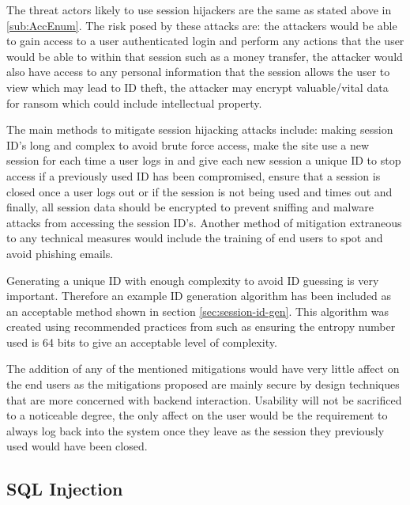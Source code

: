 \documentclass{ueacmpstyle}
\begin{document}
        The threat actors likely to use session hijackers are the same as stated above 
        in \ref{sub:AccEnum}. The risk posed by these attacks are: the attackers would 
        be able to gain access to a user authenticated login and perform any actions that the 
        user would be able to within that session such as a money transfer, the attacker would 
        also have access to any personal information that the session allows the user to view 
        which may lead to ID theft, the attacker may encrypt valuable/vital data for ransom 
        which could include intellectual property.

        The main methods to mitigate session hijacking attacks include: making session ID's 
        long and complex to avoid brute force access, make the site use a new session for 
        each time a user logs in and give each new session a unique ID to stop access if a 
        previously used ID has been compromised, ensure that a session is closed once a user 
        logs out or if the session is not being used and times out and finally, all session 
        data should be encrypted to prevent sniffing and malware attacks from accessing the 
        session ID's. Another method of mitigation extraneous to any technical measures 
        would include the training of end users to spot and avoid phishing emails.

        Generating a unique ID with enough complexity to avoid ID guessing is very important. 
        Therefore an example ID generation algorithm has been included as an acceptable 
        method shown in section \ref{sec:session-id-gen}. This algorithm was created using 
        recommended practices from \cite{OWASPSessionManagement} such as ensuring the entropy 
        number used is 64 bits to give an acceptable level of complexity.

        The addition of any of the mentioned mitigations would have very little affect on 
        the end users as the mitigations proposed are mainly secure by design techniques 
        that are more concerned with backend interaction. Usability will not be sacrificed 
        to a noticeable degree, the only affect on the user would be the requirement to 
        always log back into the system once they leave as the session they previously used 
        would have been closed.

        \subsection{SQL Injection}\label{sub:SqlInject}
\end{document}

